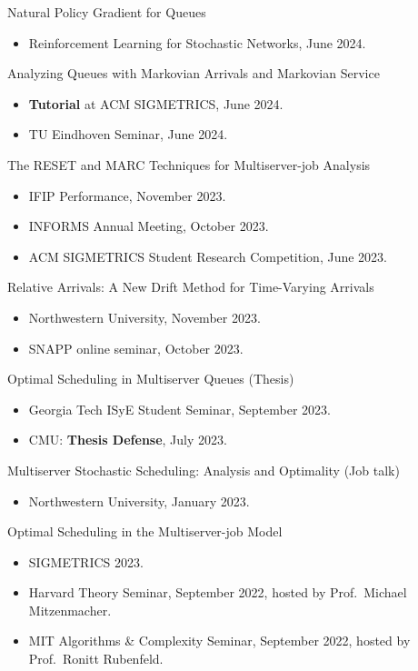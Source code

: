 \documentclass{res}
\begin{document}
\begin{resume}
    Natural Policy Gradient for Queues
    \begin{itemize}
        \item Reinforcement Learning for Stochastic Networks, June 2024.
    \end{itemize}

    Analyzing Queues with Markovian Arrivals and Markovian Service
    \begin{itemize}
        \item \textbf{Tutorial} at ACM SIGMETRICS, June 2024.
        \item TU Eindhoven Seminar, June 2024.
    \end{itemize}

    The RESET and MARC Techniques for Multiserver-job Analysis
    \begin{itemize}
        \item IFIP Performance, November 2023.
        \item INFORMS Annual Meeting, October 2023.
        \item ACM SIGMETRICS Student Research Competition, June 2023.
    \end{itemize}

    Relative Arrivals: A New Drift Method for Time-Varying Arrivals
    \begin{itemize}
        \item Northwestern University, November 2023.
        \item SNAPP online seminar, October 2023.
    \end{itemize}

    Optimal Scheduling in Multiserver Queues (Thesis)
    \begin{itemize}
        \item Georgia Tech ISyE Student Seminar, September 2023.
        \item CMU: \textbf{Thesis Defense}, July 2023.
    \end{itemize}

    Multiserver Stochastic Scheduling: Analysis and Optimality (Job talk)
    \begin{itemize}
        \item Northwestern University, January 2023.
    \end{itemize}

    Optimal Scheduling in the Multiserver-job Model
    \begin{itemize}
        \item SIGMETRICS 2023.
        \item Harvard Theory Seminar, September 2022, hosted by Prof.~Michael Mitzenmacher.
        \item MIT Algorithms \& Complexity Seminar, September 2022, hosted by Prof.~Ronitt Rubenfeld.
    \end{itemize}


\end{resume}
\end{document}
